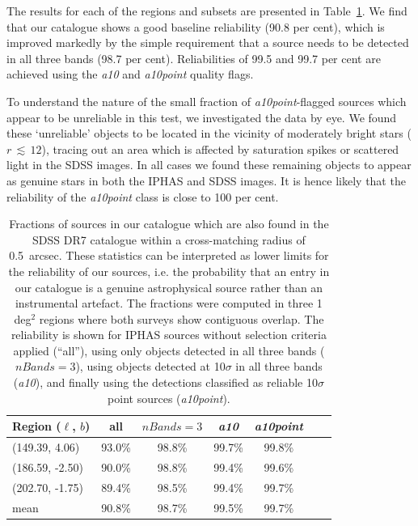 \documentclass[a4paper,useAMS,usenatbib]{mn2e}
\begin{document}
{The results for each of the regions and subsets
are presented in Table~\ref{tbl:reliability}.
We find that our catalogue shows a good
baseline reliability (90.8 per cent),
which is improved markedly by the simple requirement
that a source needs to be detected in all three bands
(98.7 per cent). 
Reliabilities of 99.5 and 99.7 per cent are achieved
using the \emph{a10} and \emph{a10point} quality flags.

To understand the nature of the small fraction
of \emph{a10point}-flagged sources
which appear to be unreliable in this test,
we investigated the data by eye.
We found these `unreliable' objects to be located
in the vicinity of moderately bright stars ($r\,\lesssim\,12$),
tracing out an area which is affected by saturation spikes or
scattered light in the SDSS images.
In all cases we found these remaining objects 
to appear as genuine stars in both the IPHAS and SDSS images.
It is hence likely that the reliability
of the \emph{a10point} class is close to 100 per cent.

\begin{table}
    \caption{Fractions of sources in our catalogue
             which are also found in the SDSS DR7 catalogue
             within a cross-matching radius of 0.5~arcsec.
             These statistics can be interpreted
             as lower limits
             for the reliability of our sources,
             i.e. the probability that an entry in our
             catalogue is a genuine astrophysical source
             rather than an instrumental artefact.
             The fractions were computed
             in three 1 deg$^2$ regions
             where both surveys
             show contiguous overlap.
             The reliability is shown
             for IPHAS sources 
             without selection criteria applied (``all''),
             using only objects detected in all three bands ($nBands=3$),
             using objects detected at 10$\sigma$
             in all three bands (\emph{a10}),
             and finally using the detections
             classified as reliable 10$\sigma$ point sources (\emph{a10point}).
             }
    \label{tbl:reliability}
    \begin{center}
        \begin{tabular}{lcccccc}
        \toprule
        Region ($\ell$, $b$) & all & $nBands=3$ & \emph{a10} & \emph{a10point} \\
        \midrule
        (149.39, 4.06) & 93.0\% & 98.8\% & 99.7\% & 99.8\% \\
        (186.59, -2.50) & 90.0\% & 98.8\% & 99.4\% & 99.6\% \\
        (202.70, -1.75) & 89.4\% & 98.5\% &99.4\% & 99.7\% \\ \midrule
        mean & 90.8\% & 98.7\% & 99.5\% & 99.7\% \\
        \bottomrule
        \end{tabular}
    \end{center}
\end{table}

}
\end{document}
